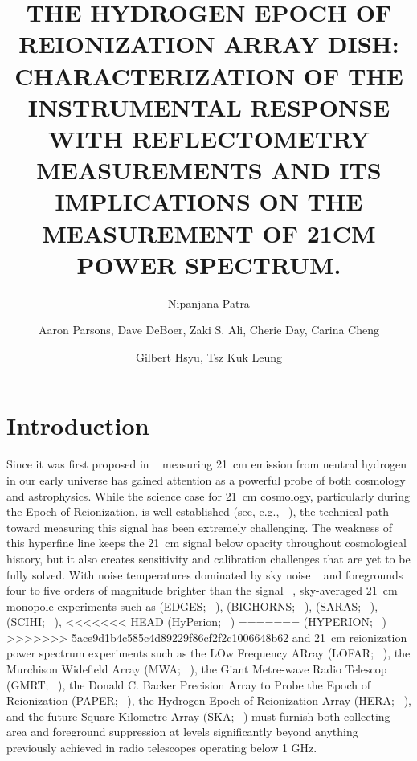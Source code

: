 \documentclass[twocolumn]{emulateapj}
\begin{document}
\title{THE HYDROGEN EPOCH OF REIONIZATION ARRAY DISH: CHARACTERIZATION OF  THE INSTRUMENTAL RESPONSE WITH REFLECTOMETRY MEASUREMENTS AND ITS IMPLICATIONS ON THE MEASUREMENT OF 21CM POWER SPECTRUM. } 

\author{Nipanjana Patra }
\author{Aaron Parsons, Dave DeBoer, Zaki S. Ali, Cherie Day, Carina Cheng}
\author{Gilbert Hsyu, Tsz Kuk Leung}

\begin{abstract}
\end{abstract}


\section{Introduction}

Since it was first proposed in ~\citep{Shaver_et_al1999} measuring 21~cm
emission from neutral hydrogen in our early universe has gained attention as a
powerful probe of both cosmology and astrophysics.  While the science case for
21~cm cosmology, particularly during the Epoch of Reionization, is well
established (see, e.g.,
~\citep{furlanetto_et_al2006,morales_wyithe2010,pritchard_loeb2012}),
the technical path toward measuring this signal has been extremely challenging.  The
weakness of this hyperfine line keeps the 21~cm signal below opacity throughout
cosmological history, but it also creates sensitivity and calibration
challenges that are yet to be fully solved.  With noise temperatures dominated
by sky noise ~\citep{XXX} and foregrounds four to five orders of magnitude
brighter than the signal ~\citep{XXX}, 
sky-averaged 21~cm monopole experiments such as
(EDGES; ~\citealt{XXX}),
(BIGHORNS; ~\citealt{XXX}),
(SARAS; ~\citealt{patra_et_al2014}),
(SCIHI; ~\citealt{voytek_et_al2014}),
<<<<<<< HEAD
(HyPerion; ~\citealt{presley_et_al2015})
=======
(HYPERION; ~\citealt{presley_et_al2015})
>>>>>>> 5ace9d1b4c585c4d89229f86cf2f2c1006648b62
and 21~cm reionization power spectrum experiments such as
the LOw Frequency ARray (LOFAR; ~\citealt{XXX}),
the Murchison Widefield Array (MWA; ~\citealt{XXX}),
the Giant Metre-wave Radio Telescop (GMRT; ~\citealt{XXX}),
the Donald C. Backer Precision Array to Probe the Epoch of Reionization (PAPER; ~\citealt{parsons_et_al2010}),
the Hydrogen Epoch of Reionization Array (HERA; ~\citealt{XXX}),
and the future Square Kilometre Array (SKA; ~\citealt{XXX})
must
furnish both collecting area and foreground suppression at levels significantly
beyond anything previously achieved in radio telescopes operating below 1 GHz.
\end{document}
